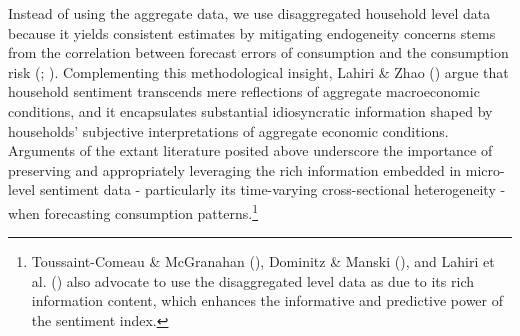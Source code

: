 \documentclass[
  abstract]{scrartcl}
\begin{document}
Instead of using the aggregate data, we use disaggregated household
level data because it yields consistent estimates by mitigating
endogeneity concerns stems from the correlation between forecast errors
of consumption and the consumption risk
(;
).
Complementing this methodological insight, Lahiri \& Zhao
() argue that household
sentiment transcends mere reflections of aggregate macroeconomic
conditions, and it encapsulates substantial idiosyncratic information
shaped by households' subjective interpretations of aggregate economic
conditions. Arguments of the extant literature posited above underscore
the importance of preserving and appropriately leveraging the rich
information embedded in micro-level sentiment data - particularly its
time-varying cross-sectional heterogeneity - when forecasting
consumption patterns.\footnote{Toussaint-Comeau \& McGranahan
  (), Dominitz \& Manski
  (), and Lahiri et al.
  () also advocate to use
  the disaggregated level data as due to its rich information content,
  which enhances the informative and predictive power of the sentiment
  index.}
\end{document}

